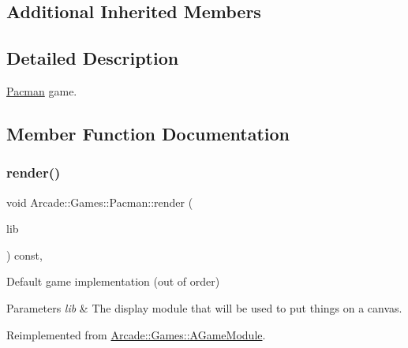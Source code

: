 \subsection*{Additional Inherited Members}


\subsection{Detailed Description}
\mbox{\hyperlink{classArcade_1_1Games_1_1Pacman}{Pacman}} game. 

\subsection{Member Function Documentation}
\mbox{\label{classArcade_1_1Games_1_1Pacman_ab1a7408f265efbef12b4f9d1a6fb4512}} 
\subsubsection{\texorpdfstring{render()}{render()}}
{\footnotesize\ttfamily void Arcade\+::\+Games\+::\+Pacman\+::render (\begin{DoxyParamCaption}\item[{\mbox{\hyperlink{classArcade_1_1Display_1_1IDisplayModule}{Arcade\+::\+Display\+::\+I\+Display\+Module}} \&}]{lib }\end{DoxyParamCaption}) const\hspace{0.3cm}{\ttfamily [final]}, {\ttfamily [virtual]}}



Default game implementation (out of order) 


\begin{DoxyParams}{Parameters}
{\em lib} & The display module that will be used to put things on a canvas. \\
\hline
\end{DoxyParams}


Reimplemented from \mbox{\hyperlink{classArcade_1_1Games_1_1AGameModule_a5897780d42d5faba3287c29b87f2b498}{Arcade\+::\+Games\+::\+A\+Game\+Module}}.

\mbox{\label{classArcade_1_1Games_1_1Pacman_aa6bc227c3f14cc8d66d11f2d32bed3ec}} 
